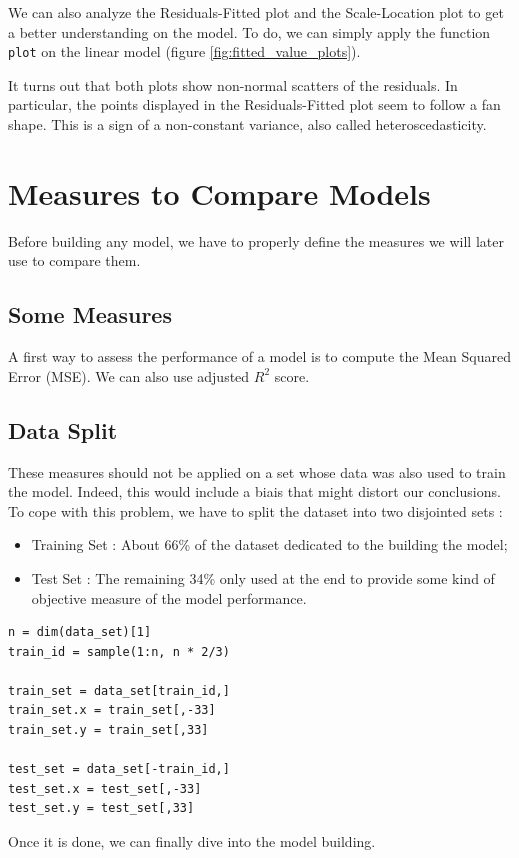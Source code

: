 \documentclass[]{report}
\begin{document}
We can also analyze the Residuals-Fitted plot and the Scale-Location plot to get a better understanding on the model. To do, we can simply apply the function \texttt{plot} on the linear model (figure \ref{fig:fitted_value_plots}).

It turns out that both plots show non-normal scatters of the residuals. In particular, the points displayed in the Residuals-Fitted plot seem to follow a fan shape. This is a sign of a non-constant variance, also called heteroscedasticity.

\section{Measures to Compare Models}
Before building any model, we have to properly define the measures we will later use to compare them. 

\subsection{Some Measures}
A first way to assess the performance of a model is to compute the Mean Squared Error (MSE). We can also use adjusted $R^2$ score.

\subsection{Data Split}
These measures should not be applied on a set whose data was also used to train the model. Indeed, this would include a biais that might distort our conclusions. To cope with this problem, we have to split the dataset into two disjointed sets : 
\begin{itemize}
	\item Training Set : About 66\% of the dataset dedicated to the building the model;
	\item Test Set : The remaining 34\% only used at the end to provide some kind of objective measure of the model performance.
\end{itemize} 

\begin{lstlisting}
n = dim(data_set)[1]
train_id = sample(1:n, n * 2/3)

train_set = data_set[train_id,]
train_set.x = train_set[,-33]
train_set.y = train_set[,33]

test_set = data_set[-train_id,]
test_set.x = test_set[,-33]
test_set.y = test_set[,33]
\end{lstlisting}

Once it is done, we can finally dive into the model building.
\end{document}
